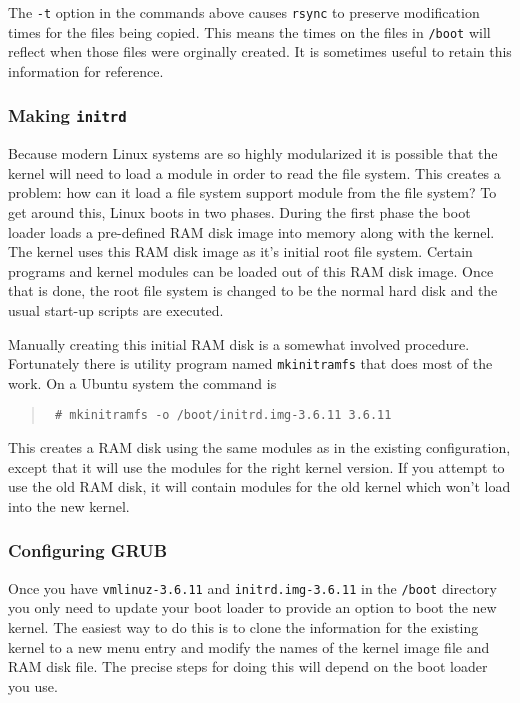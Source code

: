 \documentclass{article}
\newcommand{\command}[1]{\texttt{#1}}    %
\newcommand{\filename}[1]{\texttt{#1}}   %
\newenvironment{commands}
  {\begin{quote} \tt}
  {\end{quote}}
\begin{document}
The \command{-t} option in the commands above causes \command{rsync} to preserve modification
times for the files being copied. This means the times on the files in \filename{/boot} will
reflect when those files were orginally created. It is sometimes useful to retain this
information for reference.

\subsubsection{Making \filename{initrd}}

Because modern Linux systems are so highly modularized it is possible that the kernel will need
to load a module in order to read the file system. This creates a problem: how can it load a
file system support module from the file system? To get around this, Linux boots in two phases.
During the first phase the boot loader loads a pre-defined RAM disk image into memory along with
the kernel. The kernel uses this RAM disk image as it's initial root file system. Certain
programs and kernel modules can be loaded out of this RAM disk image. Once that is done, the
root file system is changed to be the normal hard disk and the usual start-up scripts are
executed.

Manually creating this initial RAM disk is a somewhat involved procedure. Fortunately there is
utility program named \command{mkinitramfs} that does most of the work. On a Ubuntu system the
command is
\begin{commands}
\# mkinitramfs -o /boot/initrd.img-3.6.11 3.6.11
\end{commands}

This creates a RAM disk using the same modules as in the existing configuration, except that it
will use the modules for the right kernel version. If you attempt to use the old RAM disk, it
will contain modules for the old kernel which won't load into the new kernel.

\subsubsection{Configuring GRUB}

Once you have \filename{vmlinuz-3.6.11} and \filename{initrd.img-3.6.11} in the
\filename{/boot} directory you only need to update your boot loader to provide an option to boot
the new kernel. The easiest way to do this is to clone the information for the existing kernel
to a new menu entry and modify the names of the kernel image file and RAM disk file. The precise
steps for doing this will depend on the boot loader you use.
\end{document}
